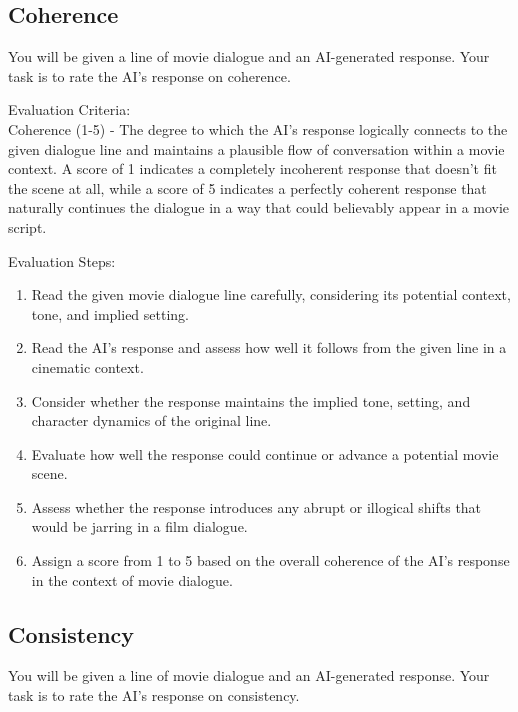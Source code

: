 \documentclass[stu,donotrepeattitle,floatsintext]{apa7}
\begin{document}
\begin{appendices}
        \subsection{Coherence}

        \noindent You will be given a line of movie dialogue and an AI-generated response. Your task is to rate the AI's response on coherence.

        \bigskip
        \noindent Evaluation Criteria:\\
        \noindent Coherence (1-5) - The degree to which the AI's response logically connects to the given dialogue line and maintains a plausible flow of conversation within a movie context. A score of 1 indicates a completely incoherent response that doesn't fit the scene at all, while a score of 5 indicates a perfectly coherent response that naturally continues the dialogue in a way that could believably appear in a movie script.

        \bigskip
        \noindent Evaluation Steps:
        \begin{enumerate}
            \item Read the given movie dialogue line carefully, considering its potential context, tone, and implied setting.
            \item Read the AI's response and assess how well it follows from the given line in a cinematic context.
            \item Consider whether the response maintains the implied tone, setting, and character dynamics of the original line.
            \item Evaluate how well the response could continue or advance a potential movie scene.
            \item Assess whether the response introduces any abrupt or illogical shifts that would be jarring in a film dialogue.
            \item Assign a score from 1 to 5 based on the overall coherence of the AI's response in the context of movie dialogue.
        \end{enumerate}

        \subsection{Consistency}

        \noindent You will be given a line of movie dialogue and an AI-generated response. Your task is to rate the AI's response on consistency.


\end{appendices}
\end{document}
